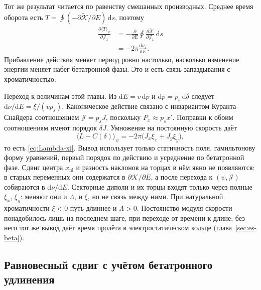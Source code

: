 Тот же результат читается по равенству смешанных производных. Среднее время оборота есть $T=\oint(-\partial\tilde{\mathcal{K}}/\partial E)\,\mathrm{d}s$, поэтому
\begin{equation}
\label{eq:mixed}
\begin{aligned}
\frac{\partial\langle T\rangle_\psi}{\partial\mathcal{J}_x}
&=-\frac{\partial}{\partial E}
\oint\frac{\partial\tilde{\mathcal{K}}}{\partial\mathcal{J}_x}\,\mathrm{d}s\\
&=-2\pi\frac{\mathrm{d}\nu_x}{\mathrm{d}E}.
\end{aligned}
\end{equation}
Прибавление действия меняет период ровно настолько, насколько изменение энергии меняет набег бетатронной фазы. Это и есть связь запаздывания с хроматичностью.

Переход к величинам этой главы. Из $\mathrm{d}E=v\,\mathrm{d}p$ и $\mathrm{d}p=p_s\,\mathrm{d}\delta$ следует $\mathrm{d}\nu/\mathrm{d}E=\xi/(v p_s)$.
Каноническое действие связано с инвариантом Куранта--Снайдера соотношением $\mathcal{J}=p_s J$, поскольку $P_x\approx p_s x'$.
Поправки к обоим соотношениям имеют порядок $\delta J$. Умножение на постоянную скорость даёт
\begin{equation}
\label{eq:Lambda-can}
\langle L-C(\delta)\rangle_\psi
=-2\pi\bigl(J_x\xi_x+J_y\xi_y\bigr),
\end{equation}
то есть \eqref{eq:Lambda-xi}. Вывод использует только статичность поля, гамильтонову форму уравнений, первый порядок по действию и усреднение по бетатронной фазе. Сдвиг центра $x_{\mathrm{nl}}$ и разность наклонов на торцах в нём явно не появляются: в старых переменных они содержатся в $\partial \mathcal{K}/\partial E$, а после перехода к $(\psi,\mathcal{J})$ собираются в $\mathrm{d}\nu/\mathrm{d}E$. Секторные диполи и их торцы входят только через полные $\xi_x$, $\xi_y$: меняют они и $\Lambda$, и $\xi$, но не связь между ними. При натуральной хроматичности $\xi<0$ путь длиннее и $\Lambda>0$. Постоянство модуля скорости понадобилось лишь на последнем шаге, при переходе от времени к длине; без него тот же вывод даёт время пролёта в электростатическом кольце (глава~\ref{sec:es-beta}).

\subsection{Равновесный сдвиг с учётом бетатронного удлинения}

